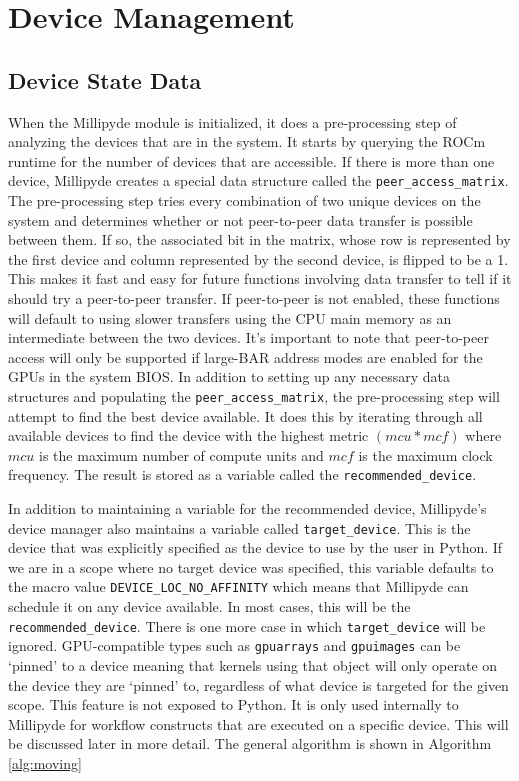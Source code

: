 \section{Device Management}

\subsection{Device State Data}

When the Millipyde module is initialized, it does a pre-processing step of analyzing the devices that are in the system. It starts by querying the ROCm runtime for the number of devices that are accessible. If there is more than one device, Millipyde creates a special data structure called the \verb|peer_access_matrix|. The pre-processing step tries every combination of two unique devices on the system and determines whether or not peer-to-peer data transfer is possible between them. If so, the associated bit in the matrix, whose row is represented by the first device and column represented by the second device, is flipped to be a 1. This makes it fast and easy for future functions involving data transfer to tell if it should try a peer-to-peer transfer. If peer-to-peer is not enabled, these functions will default to using slower transfers using the CPU main memory as an intermediate between the two devices. It's important to note that peer-to-peer access will only be supported if large-BAR address modes are enabled for the GPUs in the system BIOS. In addition to setting up any necessary data structures and populating the \verb|peer_access_matrix|, the pre-processing step will attempt to find the best device available. It does this by iterating through all available devices to find the device with the highest metric $(mcu * mcf)$ where $mcu$ is the maximum number of compute units and $mcf$ is the maximum clock frequency. The result is stored as a variable called the \verb|recommended_device|.

\quad In addition to maintaining a variable for the recommended device, Millipyde's device manager also maintains a variable called \verb|target_device|. This is the device that was explicitly specified as the device to use by the user in Python. If we are in a scope where no target device was specified, this variable defaults to the macro value \verb|DEVICE_LOC_NO_AFFINITY| which means that Millipyde can schedule it on any device available. In most cases, this will be the \verb|recommended_device|. There is one more case in which \verb|target_device| will be ignored. GPU-compatible types such as \verb|gpuarrays| and \verb|gpuimages| can be `pinned' to a device meaning that kernels using that object will only operate on the device they are `pinned' to, regardless of what device is targeted for the given scope. This feature is not exposed to Python. It is only used internally to Millipyde for workflow constructs that are executed on a specific device. This will be discussed later in more detail. The general algorithm is shown in Algorithm \ref{alg:moving}

